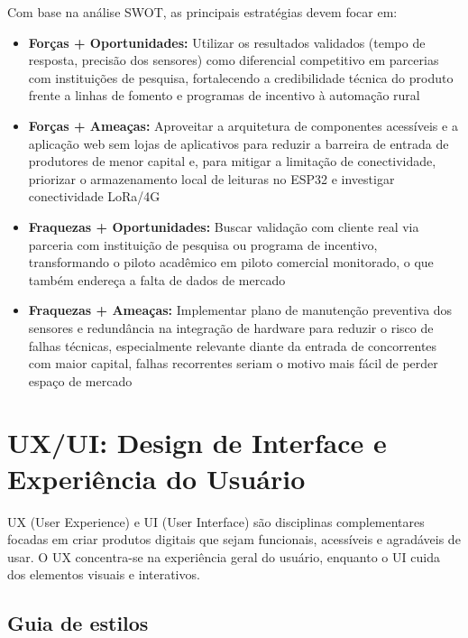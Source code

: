 \documentclass[11pt,a4paper]{article}
\begin{document}
Com base na análise SWOT, as principais estratégias devem focar em:
\begin{itemize}
    \item \textbf{Forças + Oportunidades:} Utilizar os resultados validados (tempo de resposta, precisão dos sensores) como diferencial competitivo em parcerias com instituições de pesquisa, fortalecendo a credibilidade técnica do produto frente a linhas de fomento e programas de incentivo à automação rural
    \item \textbf{Forças + Ameaças:} Aproveitar a arquitetura de componentes acessíveis e a aplicação web sem lojas de aplicativos para reduzir a barreira de entrada de produtores de menor capital e, para mitigar a limitação de conectividade, priorizar o armazenamento local de leituras no ESP32 e investigar conectividade LoRa/4G
    \item \textbf{Fraquezas + Oportunidades:} Buscar validação com cliente real via parceria com instituição de pesquisa ou programa de incentivo, transformando o piloto acadêmico em piloto comercial monitorado, o que também endereça a falta de dados de mercado
    \item \textbf{Fraquezas + Ameaças:} Implementar plano de manutenção preventiva dos sensores e redundância na integração de hardware para reduzir o risco de falhas técnicas, especialmente relevante diante da entrada de concorrentes com maior capital, falhas recorrentes seriam o motivo mais fácil de perder espaço de mercado
\end{itemize}

\section{UX/UI: Design de Interface e Experiência do Usuário}

UX (User Experience) e UI (User Interface) são disciplinas complementares focadas em criar produtos digitais que sejam funcionais, acessíveis e agradáveis de usar. O UX concentra-se na experiência geral do usuário, enquanto o UI cuida dos elementos visuais e interativos.

\subsection{Guia de estilos}
\end{document}
